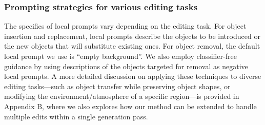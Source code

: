 \documentclass{article}
\begin{document}
\subsubsection{Prompting strategies for various editing tasks}


The specifics of local prompts vary depending on the editing task. For object insertion and replacement, local prompts describe the objects to be introduced or the new objects that will substitute existing ones. For object removal, the default local prompt we use is ``empty background''. We also employ classifier-free guidance \citep{ho2022classifier} by using descriptions of the objects targeted for removal as negative local prompts. A more detailed discussion on applying these techniques to diverse editing tasks—such as object transfer while preserving object shapes, or modifying the environment/atmosphere of a specific region—is provided in {Appendix B}, where we also explores how our method can be extended to handle multiple edits within a single generation pass.
\end{document}
